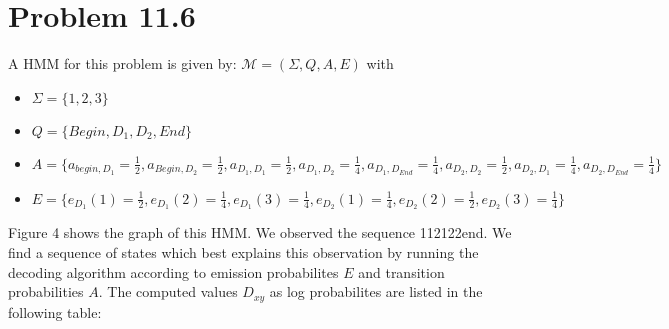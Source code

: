 \documentclass[a4paper]{article}
\begin{document}
\section{Problem 11.6}
A HMM for this problem is given by:
$\mathcal{M}=(\Sigma,\mathit{Q},\mathit{A},\mathit{E})$ with 
\begin{itemize}
\item$\Sigma=\{1,2,3\}$
\item$\mathit{Q}=\{Begin,D_1,D_2,End\}$
\item$\mathit{A}=\{a_{begin,D_1}=\frac{1}{2},a_{Begin, D_2}=\frac{1}{2},a_{D_1,D_1}=\frac{1}{2},a_{D_1,D_2}=\frac{1}{4},a_{D_1,D_{End}}=\frac{1}{4},a_{D_2,D_2}=\frac{1}{2},a_{D_2,D_1}=\frac{1}{4},a_{D_2,D_{End}}=\frac{1}{4}\}$
\item$\mathit{E}=\{e_{D_1}(1)=\frac{1}{2},e_{D_1}(2)=\frac{1}{4},e_{D_1}(3)=\frac{1}{4},e_{D_2}(1)=\frac{1}{4},e_{D_2}(2)=\frac{1}{2},e_{D_2}(3)=\frac{1}{4}\}$
\end{itemize}
Figure 4 shows the graph of this HMM. We observed the sequence 112122end. We find a sequence of states which best explains this observation by running the decoding algorithm according to emission probabilites $\mathit{E}$ and transition probabilities $\mathit{A}$. The computed values $D_{xy}$ as log probabilites are listed in the following table:
\end{document}

